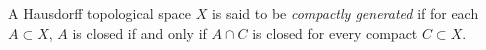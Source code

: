 \documentclass[12pt]{article}
\begin{document}
A Hausdorff topological space $X$ is said to be \emph{compactly generated} if for each $A \subset X$, $A$ is closed if and only if $A \cap C$ is closed for every compact $C \subset X$.
\end{document}
